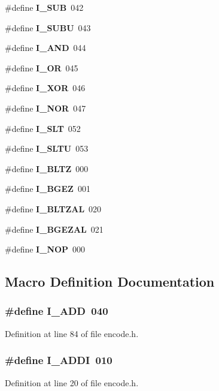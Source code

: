 \begin{DoxyCompactItemize}
\item 
\#define {\bf I\+\_\+\+S\+UB}~042
\item 
\#define {\bf I\+\_\+\+S\+U\+BU}~043
\item 
\#define {\bf I\+\_\+\+A\+ND}~044
\item 
\#define {\bf I\+\_\+\+OR}~045
\item 
\#define {\bf I\+\_\+\+X\+OR}~046
\item 
\#define {\bf I\+\_\+\+N\+OR}~047
\item 
\#define {\bf I\+\_\+\+S\+LT}~052
\item 
\#define {\bf I\+\_\+\+S\+L\+TU}~053
\item 
\#define {\bf I\+\_\+\+B\+L\+TZ}~000
\item 
\#define {\bf I\+\_\+\+B\+G\+EZ}~001
\item 
\#define {\bf I\+\_\+\+B\+L\+T\+Z\+AL}~020
\item 
\#define {\bf I\+\_\+\+B\+G\+E\+Z\+AL}~021
\item 
\#define {\bf I\+\_\+\+N\+OP}~000
\end{DoxyCompactItemize}


\subsection{Macro Definition Documentation}
\subsubsection[{I\+\_\+\+A\+DD}]{\setlength{\rightskip}{0pt plus 5cm}\#define I\+\_\+\+A\+DD~040}\label{encode_8h_a7b8300ad043f380d0f303f5d87be1ce5}


Definition at line 84 of file encode.\+h.

\subsubsection[{I\+\_\+\+A\+D\+DI}]{\setlength{\rightskip}{0pt plus 5cm}\#define I\+\_\+\+A\+D\+DI~010}\label{encode_8h_a7d9ead3e85bcad0088ea7a6fe7b6bd9b}


Definition at line 20 of file encode.\+h.

